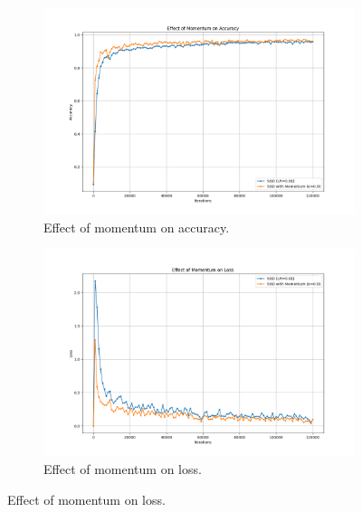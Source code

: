 \documentclass{article}
\begin{document}
\begin{figure}[H]
    \centering
    \begin{subfigure}[t]{0.48\textwidth}
        \vspace{0pt}%
        \centering
        \includegraphics[width=1.1\textwidth]{plots/part2c_momentum_accuracy.png}
        \caption{Effect of momentum on accuracy.}
        \label{fig:momentum_accuracy}
    \end{subfigure}
    \hfill
    \begin{subfigure}[t]{0.48\textwidth}
        \vspace{0pt}%
        \centering
        \includegraphics[width=1.1\textwidth]{plots/part2c_momentum_loss.png}
        \caption{Effect of momentum on loss.}
        \label{fig:momentum_loss}
    \end{subfigure}
\end{figure}
\end{document}
